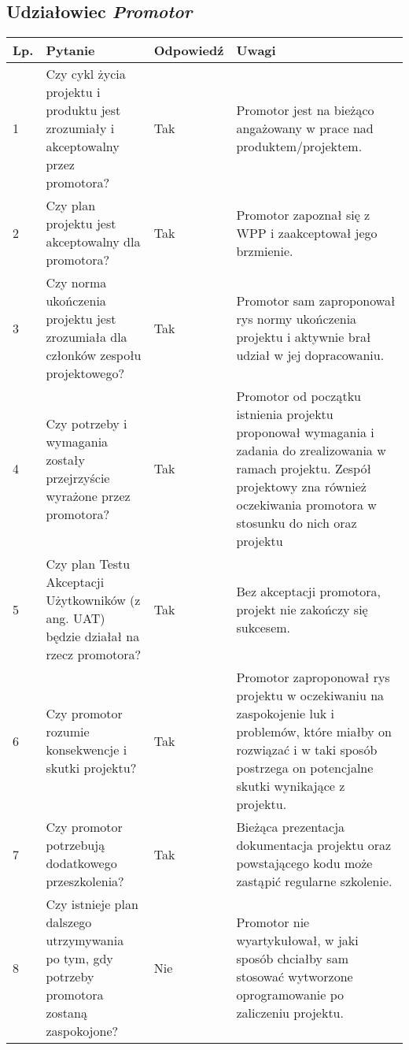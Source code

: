\documentclass[11pt,oneside,a4paper,titlepage,onecolumn]{article}
\begin{document}
\subsection{Udziałowiec \textit{Promotor}}

\begin{tabularx}{\textwidth}{|l|X|l|X|}
	\hline
	
	\hline
    Lp. & Pytanie & Odpowiedź & Uwagi \\ \hline
    
    1
    & Czy cykl życia projektu i produktu jest zrozumiały i
    akceptowalny przez promotora?
    & Tak
    & Promotor jest na bieżąco angażowany w prace nad
    produktem/projektem.
    \\\hline
    
    2
    & Czy plan projektu jest akceptowalny dla promotora?
    & Tak
    & Promotor zapoznał się z WPP i zaakceptował jego brzmienie.
    \\\hline
    
    3
    & Czy norma ukończenia projektu jest zrozumiała dla członków
    zespołu projektowego?
    & Tak
    & Promotor sam zaproponował rys normy ukończenia projektu i
    aktywnie brał udział w jej dopracowaniu.
    \\\hline
    
    4
    & Czy potrzeby i wymagania zostały przejrzyście wyrażone
    przez promotora?
    & Tak
    & Promotor od początku istnienia projektu proponował wymagania
    i zadania do zrealizowania w ramach projektu. Zespół projektowy
    zna również oczekiwania promotora w stosunku do nich oraz
    projektu
    \\\hline
    
    5
    & Czy plan Testu Akceptacji Użytkowników (z ang. UAT) będzie
    działał na rzecz promotora?
    & Tak
    & Bez akceptacji promotora, projekt nie zakończy się sukcesem.
    \\\hline
    
    6
    & Czy promotor rozumie konsekwencje i skutki projektu?
    & Tak
    & Promotor zaproponował rys projektu w oczekiwaniu na 
    zaspokojenie luk i problemów, które miałby on rozwiązać i
    w taki sposób postrzega on potencjalne skutki wynikające
    z projektu.
    \\\hline
    
    7
    & Czy promotor potrzebują dodatkowego przeszkolenia?
    & Tak
    & Bieżąca prezentacja dokumentacja projektu oraz powstającego
    kodu może zastąpić regularne szkolenie.
    \\\hline
    
    8
    & Czy istnieje plan dalszego utrzymywania po tym, gdy
    potrzeby promotora zostaną zaspokojone?
    & Nie
    & Promotor nie wyartykułował, w jaki sposób chciałby sam
    stosować wytworzone oprogramowanie po zaliczeniu projektu.
    \\\hline
\end{tabularx}
\end{document}
